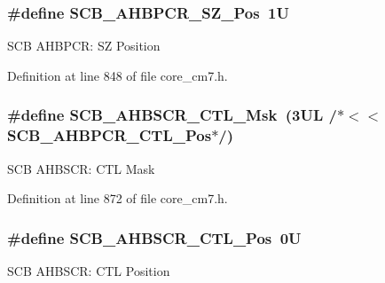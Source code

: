 \subsubsection[{\texorpdfstring{S\+C\+B\+\_\+\+A\+H\+B\+P\+C\+R\+\_\+\+S\+Z\+\_\+\+Pos}{SCB_AHBPCR_SZ_Pos}}]{\setlength{\rightskip}{0pt plus 5cm}\#define S\+C\+B\+\_\+\+A\+H\+B\+P\+C\+R\+\_\+\+S\+Z\+\_\+\+Pos~1U}\hypertarget{group___c_m_s_i_s___s_c_b_ga0f5d024d0d233713c33c5ba1a936d8d2}{}\label{group___c_m_s_i_s___s_c_b_ga0f5d024d0d233713c33c5ba1a936d8d2}
S\+CB A\+H\+B\+P\+CR\+: SZ Position 

Definition at line 848 of file core\+\_\+cm7.\+h.

\subsubsection[{\texorpdfstring{S\+C\+B\+\_\+\+A\+H\+B\+S\+C\+R\+\_\+\+C\+T\+L\+\_\+\+Msk}{SCB_AHBSCR_CTL_Msk}}]{\setlength{\rightskip}{0pt plus 5cm}\#define S\+C\+B\+\_\+\+A\+H\+B\+S\+C\+R\+\_\+\+C\+T\+L\+\_\+\+Msk~(3\+U\+L /$\ast$$<$$<$ S\+C\+B\+\_\+\+A\+H\+B\+P\+C\+R\+\_\+\+C\+T\+L\+\_\+\+Pos$\ast$/)}\hypertarget{group___c_m_s_i_s___s_c_b_gab2aa81692dfec47f8b69a3f425ca1022}{}\label{group___c_m_s_i_s___s_c_b_gab2aa81692dfec47f8b69a3f425ca1022}
S\+CB A\+H\+B\+S\+CR\+: C\+TL Mask 

Definition at line 872 of file core\+\_\+cm7.\+h.

\subsubsection[{\texorpdfstring{S\+C\+B\+\_\+\+A\+H\+B\+S\+C\+R\+\_\+\+C\+T\+L\+\_\+\+Pos}{SCB_AHBSCR_CTL_Pos}}]{\setlength{\rightskip}{0pt plus 5cm}\#define S\+C\+B\+\_\+\+A\+H\+B\+S\+C\+R\+\_\+\+C\+T\+L\+\_\+\+Pos~0U}\hypertarget{group___c_m_s_i_s___s_c_b_gabfdcfa4029b1249d45a649ff37c04d65}{}\label{group___c_m_s_i_s___s_c_b_gabfdcfa4029b1249d45a649ff37c04d65}
S\+CB A\+H\+B\+S\+CR\+: C\+TL Position 

